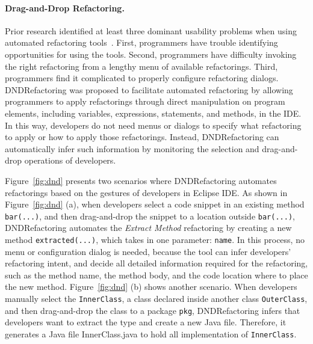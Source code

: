 \documentclass[runningheads,a4paper]{llncs}
\newcommand{\codefont}[1]{\footnotesize{\texttt{#1}}\normalsize}
\begin{document}
\paragraph{Drag-and-Drop Refactoring.} Prior research identified at least three dominant usability problems when using automated refactoring tools~\cite{OConnor:2005,Mealy:2007,Parnin:2008,Murphy-Hill:2008,Murphy-Hill:2011,Vakilian:2012}. First, programmers have trouble identifying opportunities for using the tools. Second, programmers have difficulty invoking the right refactoring from a lengthy menu of available refactorings. Third, programmers find it complicated to properly configure refactoring dialogs. DNDRefactoring was proposed to facilitate automated refactoring by allowing programmers to apply refactorings through direct manipulation on program elements, including variables, expressions, statements, and methods, in the IDE. In this way, developers do not need menus or dialogs to specify what refactoring to apply or how to apply those refactorings. Instead, DNDRefactoring can automatically infer such information by monitoring the selection and drag-and-drop operations of developers.

Figure~\ref{fig:dnd} presents two scenarios where DNDRefactoring automates refactorings based on the gestures of developers in Eclipse IDE. As shown in Figure~\ref{fig:dnd} (a), when developers select a code snippet in an existing method \codefont{bar(...)}, and then drag-and-drop the snippet to a location outside \codefont{bar(...)}, DNDRefactoring automates the \emph{Extract Method} refactoring by creating a new method \codefont{extracted(...)}, which takes in one parameter: \codefont{name}. In this process, no menu or configuration dialog is needed, because the tool can infer developers' refactoring intent, and decide all detailed information required for the refactoring, such as the method name, the method body, and the code location where to place the new method. Figure~\ref{fig:dnd} (b) shows another scenario. When developers manually select the \codefont{InnerClass}, a class declared inside another class \codefont{OuterClass}, and then drag-and-drop the class to a package \codefont{pkg}, DNDRefactoring infers that developers want to extract the type and create a new Java file. Therefore, it generates a Java file InnerClass.java to hold all implementation of \codefont{InnerClass}.
\end{document}
